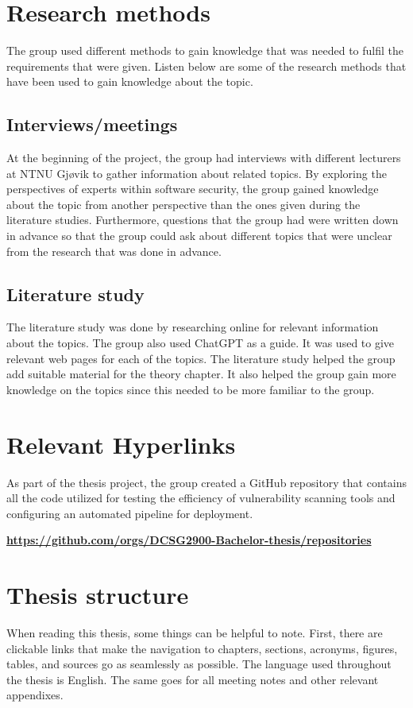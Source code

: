 \newpage
\section{Research methods}
The group used different methods to gain knowledge that was needed to fulfil the requirements that were given. 
Listen below are some of the research methods that have been used to gain knowledge about the topic. 
\subsection{Interviews/meetings}
At the beginning of the project, the group had interviews with different lecturers at NTNU Gjøvik to gather information about related topics. By exploring the perspectives of experts within software security, the group gained knowledge about the topic from another perspective than the ones given during the literature studies. Furthermore, questions that the group had were written down in advance so that the group could ask about different topics that were unclear from the research that was done in advance.   

\subsection{Literature study}
The literature study was done by researching online for relevant information about the topics. The group also used ChatGPT as a guide. It was used to give relevant web pages for each of the topics. The literature study helped the group add suitable material for the theory chapter. It also helped the group gain more knowledge on the topics since this needed to be more familiar to the group. 

\section{Relevant Hyperlinks}
As part of the thesis project, the group created a GitHub repository that contains all the code utilized for testing the efficiency of vulnerability scanning tools and configuring an automated pipeline for deployment. 

\href{https://github.com/orgs/DCSG2900-Bachelor-thesis/repositories}{\textbf{https://github.com/orgs/DCSG2900-Bachelor-thesis/repositories}}

\section{Thesis structure}
When reading this thesis, some things can be helpful to note. First, there are clickable links that make the navigation to chapters, sections, acronyms, figures, tables, and sources go as seamlessly as possible. The language used throughout the thesis is English. The same goes for all meeting notes and other relevant appendixes. 

